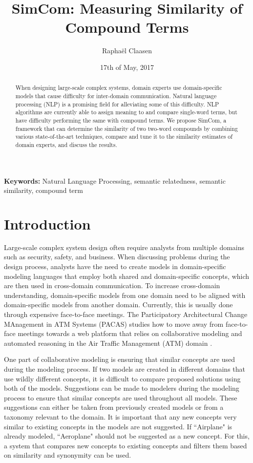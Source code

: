 \documentclass{article}
\title{SimCom: Measuring Similarity of Compound Terms}
\date{17th of May, 2017}
\author{Rapha\"el Claasen}
\begin{document}
\maketitle

\begin{abstract}
When designing large-scale complex systems, domain experts use domain-specific models that cause difficulty for inter-domain communication. Natural language processing (NLP) is a promising field for alleviating some of this difficulty. NLP algorithms are currently able to assign meaning to and compare single-word terms, but have difficulty performing the same with compound terms. We propose SimCom, a framework that can determine the similarity of two two-word compounds by combining various state-of-the-art techniques, compare and tune it to the similarity estimates of domain experts, and discuss the results.
\end{abstract}

{\bf Keywords:} Natural Language Processing, semantic relatedness, semantic similarity, compound term

\section{Introduction} \label{sec:introduction}

Large-scale complex system design often require analysts from multiple domains such as security, safety, and business. When discussing problems during the design process, analysts have the need to create models in domain-specific modeling languages that employ both shared and domain-specific concepts, which are then used in cross-domain communication. To increase cross-domain understanding, domain-specific models from one domain need to be aligned with domain-specific models from another domain. Currently, this is usually done through expensive face-to-face meetings. The Participatory Architectural Change MAnagement in ATM Systems (PACAS) studies how to move away from face-to-face meetings towards a web platform that relies on collaborative modeling and automated reasoning in the Air Traffic Management (ATM) domain \cite{aydemir2017towards}.

One part of collaborative modeling is ensuring that similar concepts are used during the modeling process. If two models are created in different domains that use wildly different concepts, it is difficult to compare proposed solutions using both of the models. Suggestions can be made to modelers during the modeling process to ensure that similar concepts are used throughout all models. These suggestions can either be taken from previously created models or from a taxonomy relevant to the domain. It is important that any new concepts very similar to existing concepts in the models are not suggested. If ``Airplane" is already modeled, ``Aeroplane" should not be suggested as a new concept. For this, a system that compares new concepts to existing concepts and filters them based on similarity and synonymity can be used.
\end{document}
